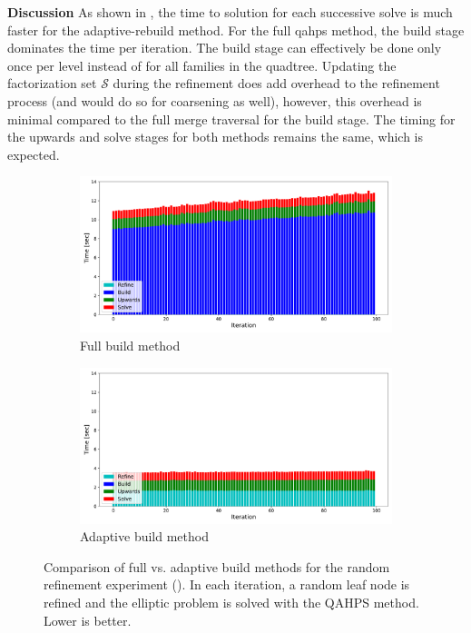 {\bf Discussion}
As shown in , the time to solution for each successive solve is much faster for the adaptive-rebuild method. For the full \gls{qahps} method, the build stage dominates the time per iteration. The build stage can effectively be done only once per level instead of for all families in the quadtree. Updating the factorization set $\mathcal{S}$ during the refinement does add overhead to the refinement process (and would do so for coarsening as well), however, this overhead is minimal compared to the full merge traversal for the build stage. The timing for the upwards and solve stages for both methods remains the same, which is expected.

\begin{figure}
    \centering
    \begin{subfigure}[t]{1\textwidth}
        \includegraphics[width=\textwidth, clip=true, trim={10 10 10 10}]{figures/full-stacked-bar-no-title.pdf}
        \caption{Full build method}
        \label{fig:full-time-comparison}
    \end{subfigure}
    \begin{subfigure}[t]{1\textwidth}
        \includegraphics[width=\textwidth, clip=true, trim={10 10 10 10}]{figures/adaptive-stacked-bar-no-title.pdf}
        \caption{Adaptive build method}
        \label{fig:adaptive-time-comparison}
    \end{subfigure}
    \caption{Comparison of full vs. adaptive build methods for the random refinement experiment (). In each iteration, a random leaf node is refined and the elliptic problem is solved with the QAHPS method. Lower is better.}
    \label{fig:full-vs-adaptive-time-comparison}
\end{figure}